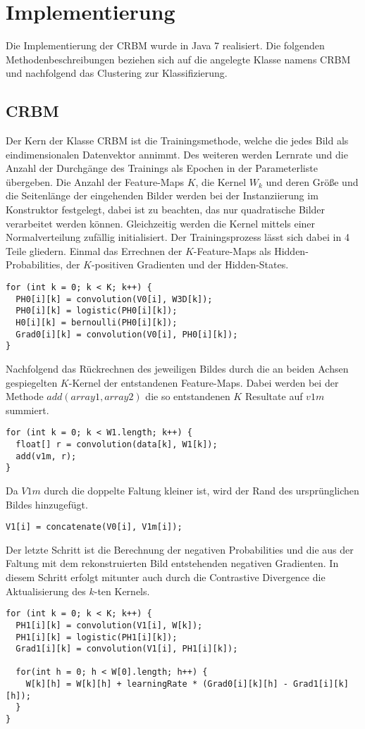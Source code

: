 \section{Implementierung}\label{implementation}
Die Implementierung der CRBM wurde in Java 7 realisiert.
Die folgenden Methodenbeschreibungen beziehen sich auf die angelegte Klasse namens CRBM und nachfolgend das Clustering zur Klassifizierung.
\subsection{CRBM}
Der Kern der Klasse CRBM ist die Trainingsmethode, welche die jedes Bild als eindimensionalen Datenvektor annimmt. Des weiteren werden Lernrate und die Anzahl der Durchgänge des Trainings als Epochen in der Parameterliste übergeben.
Die Anzahl der Feature-Maps $K$, die Kernel $W_k$ und deren Größe und die Seitenlänge der eingehenden Bilder werden bei der Instanziierung im Konstruktor festgelegt, dabei ist zu beachten, das nur quadratische Bilder verarbeitet werden können. Gleichzeitig werden die Kernel mittels einer Normalverteilung zufällig initialisiert.
Der Trainingsprozess lässt sich dabei in 4 Teile gliedern. Einmal das Errechnen der $K$-Feature-Maps als Hidden-Probabilities, der $K$-positiven Gradienten und der Hidden-States.
\begin{lstlisting}
for (int k = 0; k < K; k++) {
  PH0[i][k] = convolution(V0[i], W3D[k]);
  PH0[i][k] = logistic(PH0[i][k]);
  H0[i][k] = bernoulli(PH0[i][k]);
  Grad0[i][k] = convolution(V0[i], PH0[i][k]);
}
\end{lstlisting}
Nachfolgend das Rückrechnen des jeweiligen Bildes durch die an beiden Achsen gespiegelten $K$-Kernel der entstandenen Feature-Maps. 
Dabei werden bei der Methode $add(array1, array2)$ die so entstandenen $K$ Resultate auf $v1m$ summiert.
\begin{lstlisting}
for (int k = 0; k < W1.length; k++) {
  float[] r = convolution(data[k], W1[k]);
  add(v1m, r);
}
\end{lstlisting}
Da $V1m$ durch die doppelte Faltung kleiner ist, wird der Rand des ursprünglichen Bildes hinzugefügt.
\begin{lstlisting}
V1[i] = concatenate(V0[i], V1m[i]);
\end{lstlisting}
Der letzte Schritt ist die Berechnung der negativen Probabilities und die aus der Faltung mit dem rekonstruierten Bild entstehenden negativen Gradienten. 
In diesem Schritt erfolgt mitunter auch durch die Contrastive Divergence die Aktualisierung des $k$-ten Kernels.
\begin{lstlisting}
for (int k = 0; k < K; k++) {
  PH1[i][k] = convolution(V1[i], W[k]);
  PH1[i][k] = logistic(PH1[i][k]);
  Grad1[i][k] = convolution(V1[i], PH1[i][k]);

  for(int h = 0; h < W[0].length; h++) {
    W[k][h] = W[k][h] + learningRate * (Grad0[i][k][h] - Grad1[i][k][h]);
  }
}
\end{lstlisting}

